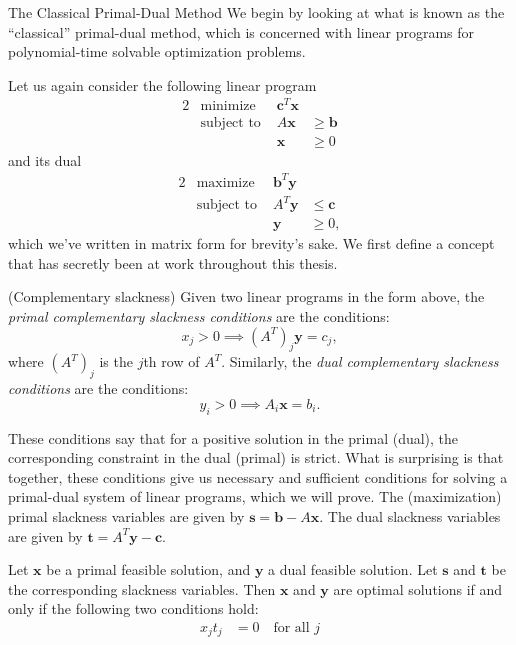 \begin{section}{The Classical Primal-Dual Method}
	We begin by looking at what is known as the ``classical'' primal-dual method, which is concerned 
	with linear programs for polynomial-time solvable optimization problems.

	Let us again consider the following linear program
	\begin{alignat}{2}
		& \text{minimize} & \mathbf{c}^{T}\mathbf{x} \\
		& \text{subject to } & A\mathbf{x} & \geq \mathbf{b} \\
		&& \mathbf{x} & \geq 0
	\end{alignat}
	and its dual
	\begin{alignat}{2}
		& \text{maximize} & \mathbf{b}^{T}\mathbf{y} \\
		& \text{subject to } & A^{T}\mathbf{y} & \leq \mathbf{c} \\
		&& \mathbf{y} & \geq 0,
	\end{alignat}
	which we've written in matrix form for brevity's sake.
	We first define a concept that has secretly been at work throughout this thesis. 
	\begin{definition}{(Complementary slackness)}
		Given two linear programs in the form above, the \emph{primal complementary slackness 
		conditions} are the conditions:
		\[
			x_j > 0 \implies (A^{T})_j \mathbf{y} = c_j,
		\]
		where $(A^{T})_j$ is the $j$th row of $A^{T}$. Similarly, the \emph{dual complementary 
		slackness conditions} are the conditions:
		\[
			y_i > 0 \implies A_i\mathbf{x} = b_i.
		\] 
	\end{definition}
		These conditions say that for a positive solution in the primal (dual), 
		the corresponding 
		constraint in the dual (primal) is strict. What is surprising is that
		together, these conditions give us necessary and 
		sufficient conditions for solving a primal-dual system of linear programs, 
		which we will prove. The (maximization) primal slackness variables are given by 
		$\mathbf{s} = \mathbf{b} - A\mathbf{x}$. The dual slackness variables are given by 
		$\mathbf{t} = A^{T}\mathbf{y} - \mathbf{c}$.
	\begin{theorem}
		Let $\mathbf{x}$ be a primal feasible solution, and $\mathbf{y}$ a dual feasible 
		solution. Let $\mathbf{s}$ and $\mathbf{t}$ be the corresponding slackness variables. 
		Then $\mathbf{x}$ and $\mathbf{y}$ are optimal solutions if and only if the following 
		two conditions hold:
		\begin{align}
			x_jt_j &= 0 \quad \text{for all } j \\

\end{align}
\end{theorem}
\end{section}
